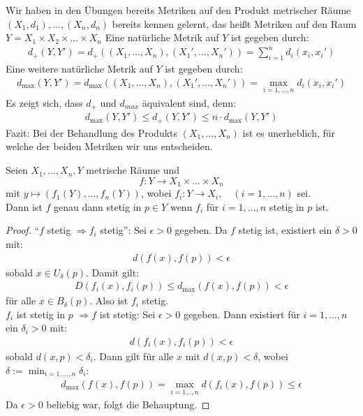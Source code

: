 \begin{Einschub}{
	Wir haben in den Übungen bereits Metriken auf den Produkt metrischer Räume 
	$(X_1,d_1) , \hdots, (X_n, d_n)$ bereits kennen gelernt, das heißt
	Metriken auf den Raum $Y= X_1 \times X_2 \times \hdots \times X_n$
	Eine natürliche Metrik auf $Y$ ist gegeben durch:
	\begin{align*}
		d_+ (Y,Y') = d_+ ((X_1, \hdots, X_n), (X_1', \hdots, X_n')) 
		= \sum_{i = 1}^n d_i(x_i,x_i')
	\end{align*}
	Eine weitere natürliche Metrik auf $Y$ ist gegeben durch:
	\begin{align*}
		d_{\max}(Y,Y') = d_{\max}((X_1, \hdots, X_n),(X_1', \hdots, 
			X_n')) = \max_{i=1, \hdots, n} d_i(x_i,x_i')
	\end{align*}
	Es zeigt sich, dass $d_+$ und $d_{max}$ äquivalent sind, denn:
	\begin{align*}
		d_{\max} (Y, Y') \leq d_+(Y, Y') \leq n \cdot d_{\max} 
		(Y, Y')
	\end{align*}
	Fazit: Bei der Behandlung des Produkts $(X_1, \hdots, X_n)$ ist es unerheblich, 
	für welche der beiden Metriken wir uns entscheiden.
}\end{Einschub}

\begin{Proposition}{%
	Seien $X_1, \hdots, X_n, Y$ metrische Räume und 
		$$f: Y \rightarrow X_1 \times \hdots \times X_n$$ mit $y \mapsto (f_1(Y), \hdots, f_n(Y))$,
		 wobei 
	$f_i: Y \rightarrow X_i, \quad (i = 1, \hdots, n)$ sei. \\
	Dann ist $f$ genau dann stetig in $p \in Y$ wenn $f_i$ für $i= 1, \hdots, n$
	stetig in $p$ ist.
}\end{Proposition}

\begin{proof}
	\enquote{$f$ stetig $\Rightarrow f_i$ stetig}:
	Sei $\epsilon > 0$ gegeben. Da $f$ stetig ist, existiert ein $\delta > 0$ mit:
	\begin{align*}
		d(f(x),f(p)) < \epsilon
	\end{align*}
	sobald $x \in U_\delta (p)$. Damit gilt:
	\begin{align*}
		D(f_i(x),f_i(p)) \leq d_{\max} (f(x), f(p)) < \epsilon
	\end{align*}
	für alle $x \in B_\delta(p)$. Also ist $f_i$ stetig.\\
	\glqq $f_i$ ist stetig in $p$ $\Rightarrow f$ ist stetig\grqq{}:
	Sei $\epsilon > 0$ gegeben. Dann existiert für \newline $i = 1, \hdots, n$ ein 
	$\delta_i > 0$ mit: 
	\begin{align*}
		d(f_i(x),f_i(p))< \epsilon
	\end{align*}
	sobald $d(x,p) < \delta_i$. Dann gilt für alle $x$ mit $d(x,p) <\delta$, wobei 
	$\delta := \min_{i = 1, \hdots, n} \delta_i$:
	\begin{align*}
		d_{\max}(f(x),f(p)) = \max_{i=1\hdots,n} d(f_i(x),f(p)) \leq \epsilon
	\end{align*}
	Da $\epsilon > 0$ beliebig war, folgt die Behauptung.
\end{proof}

